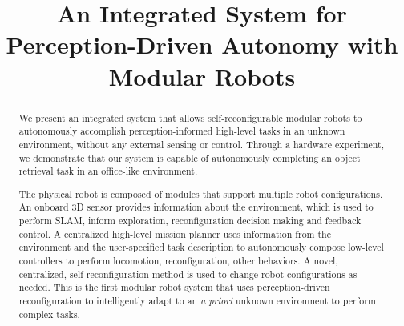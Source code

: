 \documentclass[conference]{IEEEtran}
\begin{document}
\title{An Integrated System for Perception-Driven Autonomy with Modular Robots}


\author{
\and
{}
\and
{}
\and
{}
}

\maketitle

\begin{abstract}

We present an integrated system that allows self-reconfigurable modular robots to autonomously accomplish perception-informed high-level tasks in an unknown environment, without any external sensing or control.  Through a hardware experiment, we demonstrate that our system is capable of autonomously completing an object retrieval task in an office-like environment.

The physical robot is composed of modules that support multiple robot configurations. An onboard 3D sensor provides information about the environment, which is used to perform SLAM, inform exploration, reconfiguration decision making and feedback control.  A centralized high-level mission planner uses information from the environment and the user-specified task description to autonomously compose low-level controllers to perform locomotion, reconfiguration, other behaviors. A novel, centralized, self-reconfiguration method is used to change robot configurations as needed. This is the first modular robot system that uses perception-driven reconfiguration to intelligently adapt to an \textit{a priori} unknown environment to perform complex tasks.

\end{abstract}

\IEEEpeerreviewmaketitle

\end{document}
